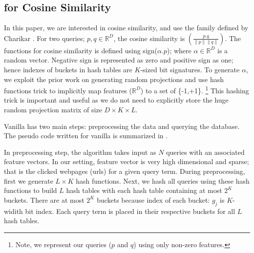 \subsection{\lsh for Cosine Similarity}
\label{subsec:vlsh:cosine}
In this paper, we are interested in cosine similarity, and use the \lsh family defined by Charikar . 
For two queries; $p,q \in \mathbb{R}^D$, the cosine similarity is $\left( \frac{p.q}{ \| p \| \| q \| }\right)$. 
The \lsh functions for cosine similarity is defined using sign($\alpha.p$); where $\alpha \in \mathbb{R}^D$ is a random vector. 
Negative sign is represented as zero and positive sign as one; hence indexes of buckets in hash tables are $K$-sized bit signatures.  
To generate $\alpha$, we exploit the prior work on 
generating random projections \cite{Achlioptas03,LiH06} and 
use hash functions trick to implicitly map features ($\mathbb{R}^D$) to a set of \{-1,+1\}.
\footnote{Note, we represent our queries ($p$ and $q$) using only non-zero features.}  
This hashing trick is important and useful as we do not need to explicitly store the 
huge random projection matrix of size $D \times K \times L$.  


Vanilla \lsh has two main steps: preprocessing the data and querying the database.  
The pseudo code written for vanilla \lsh is summarized in . 

In preprocessing step, the algorithm takes input as $N$ queries with an associated feature vectors. In our setting, 
feature vector is very high dimensional and sparse; that is the clicked webpages (urls) for a given query term. 
During preprocessing, first we generate $L\times K$ hash functions. 
Next, we hash all queries using these hash functions to build $L$ hash tables 
with each hash table containing at most $2^K$ buckets. 
There are at most $2^K$ buckets because index of each bucket: $g_j$ is $K$-widith bit index. 
Each query term is placed in their respective buckets for all  $L$ hash tables.

